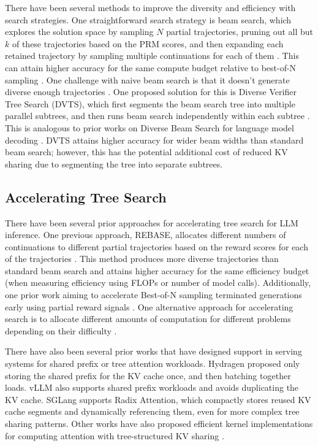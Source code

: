 There have been several methods to improve the diversity and efficiency with search strategies.
One straightforward search strategy is beam search, which explores the solution space by sampling $N$ partial trajectories, pruning out all but $k$ of these trajectories based on the PRM scores, and then expanding each retained trajectory by sampling multiple continuations for each of them \cite{snell2024scaling,beeching2024scalingtesttimecompute, qiu2024treebon}.
This can attain higher accuracy for the same compute budget relative to best-of-N sampling \cite{snell2024scaling}.
One challenge with naive beam search is that it doesn't generate diverse enough trajectories \cite{beeching2024scalingtesttimecompute}.
One proposed solution for this is Diverse Verifier Tree Search (DVTS), which first segments the beam search tree into multiple parallel subtrees, and then runs beam search independently within each subtree \cite{beeching2024scalingtesttimecompute}.
This is analogous to prior works on Diverse Beam Search for language model decoding \cite{li2016mutual,vijayakumar2016diverse}.
DVTS attains higher accuracy for wider beam widths than standard beam search; however, this has the potential additional cost of reduced KV sharing due to segmenting the tree into separate subtrees.

\subsection{Accelerating Tree Search}

There have been several prior approaches for accelerating tree search for LLM inference. 
One previous approach, REBASE, allocates different numbers of continuations to different partial trajectories based on the reward scores for each of the trajectories \cite{wu2024inference}.
This method produces more diverse trajectories than standard beam search and attains higher accuracy for the same efficiency budget (when measuring efficiency using FLOPs or number of model calls).
Additionally, one prior work aiming to accelerate Best-of-N sampling terminated generations early using partial reward signals \cite{sun2024fast}.
One alternative approach for accelerating search is to allocate different amounts of computation for different problems depending on their difficulty \cite{zhang2024scaling,snell2024scaling, beeching2024scalingtesttimecompute}.

There have also been several prior works that have designed support in serving systems for shared prefix or tree attention workloads.
Hydragen \cite{juravsky2024hydragen} proposed only storing the shared prefix for the KV cache once, and then batching together loads.
vLLM \cite{kwon2023efficient} also supports shared prefix workloads and avoids duplicating the KV cache.
SGLang \cite{zheng2023efficiently} supports Radix Attention, which compactly stores reused KV cache segments and dynamically referencing them, even for more complex tree sharing patterns.
Other works have also proposed efficient kernel implementations for computing attention with tree-structured KV sharing \cite{yao2024deft}.